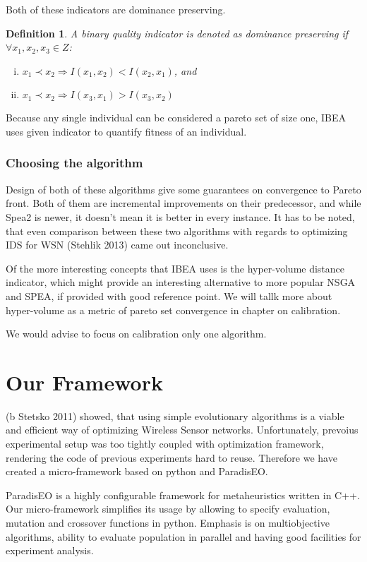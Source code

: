 \documentclass[12pt,oneside,draft]{fithesis2}
\newtheorem{defn}{Definition}
\begin{document}
Both of these indicators are dominance preserving. 

\begin{defn}
A binary quality indicator is denoted as dominance preserving if $\forall x_1,x_2,x_3 \in Z$:
\begin{enumerate}[(i)]
\item  $x_1 \prec x_2 \Rightarrow I({x_1},{x_2}) < I({x_2},{x_1})$, and
\item $x_1 \prec x_2 \Rightarrow I({x_3},{x_1}) > I({x_3},{x_2})$
\end{enumerate}
\end{defn}
Because any single individual can be considered a pareto set of size one, IBEA uses given indicator to quantify fitness of an individual.



\subsection{Choosing the algorithm}
Design of both of these algorithms give some guarantees on convergence to Pareto front. Both of them are incremental improvements on their predecessor, and while Spea2 is newer, it doesn't mean it is better in every instance. It has to be noted, that even comparison between these two algorithms with regards to optimizing IDS for WSN (Stehlik 2013) came out inconclusive. 

Of the more interesting concepts that IBEA uses is the hyper-volume distance indicator, which might provide an interesting alternative to more popular NSGA and SPEA, if provided with good reference point. We will tallk more about hyper-volume as a metric of pareto set convergence in chapter on calibration.

We would advise to focus on calibration only one algorithm.

\chapter{Our Framework}

(b Stetsko 2011) showed, that using simple evolutionary algorithms is a viable and efficient way of optimizing Wireless Sensor networks. Unfortunately, prevoius experimental setup was too tightly coupled with optimization framework, rendering the code of previous experiments hard to reuse. Therefore we have created a micro-framework based on python and ParadisEO. 

ParadisEO is a highly configurable framework for metaheuristics written in C++. Our micro-framework simplifies its usage by allowing to specify evaluation, mutation and crossover functions in python. Emphasis is on multiobjective algorithms, ability to evaluate population in parallel and having good facilities for experiment analysis.
\end{document}

